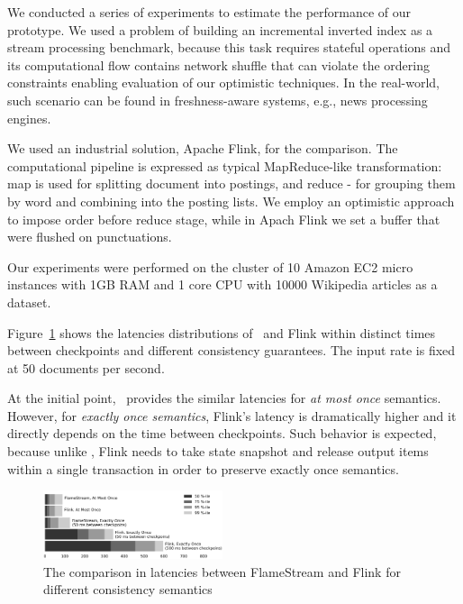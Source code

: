 \label {fs-short-experiments}

We conducted a series of experiments to estimate the performance of our prototype. We used a problem of building an incremental inverted index as a stream processing benchmark, because this task requires stateful operations and its computational flow contains network shuffle that can violate the ordering constraints enabling evaluation of our optimistic techniques. In the real-world, such scenario can be found in freshness-aware systems, e.g., news processing engines.

We used an industrial solution, Apache Flink, for the comparison. The computational pipeline is expressed as typical MapReduce-like transformation: map is used for splitting document into postings, and reduce - for grouping them by word and combining into the posting lists. We employ an optimistic approach to impose order before reduce stage, while in Apach Flink we set a buffer that were flushed on punctuations.

Our experiments were performed on the cluster of 10 Amazon EC2 micro instances with 1GB RAM and 1 core CPU with 10000 Wikipedia articles as a dataset.

Figure~\ref{performance} shows the latencies distributions of \FlameStream\ and Flink within distinct times between checkpoints and different consistency guarantees. The input rate is fixed at 50 documents per second.

At the initial point, \FlameStream\ provides the similar latencies for {\it at most once} semantics. However, for {\it exactly once semantics}, Flink's latency is dramatically higher and it directly depends on the time between checkpoints. Such behavior is expected, because unlike \FlameStream, Flink needs to take state snapshot and release output items within a single transaction in order to preserve exactly once semantics.

\begin{figure}[htbp]
  \centering
  \includegraphics[width=0.47\textwidth]{pics/comparison}
  \caption{The comparison in latencies between FlameStream and Flink for different consistency semantics}
  \label {performance}
\end{figure}
